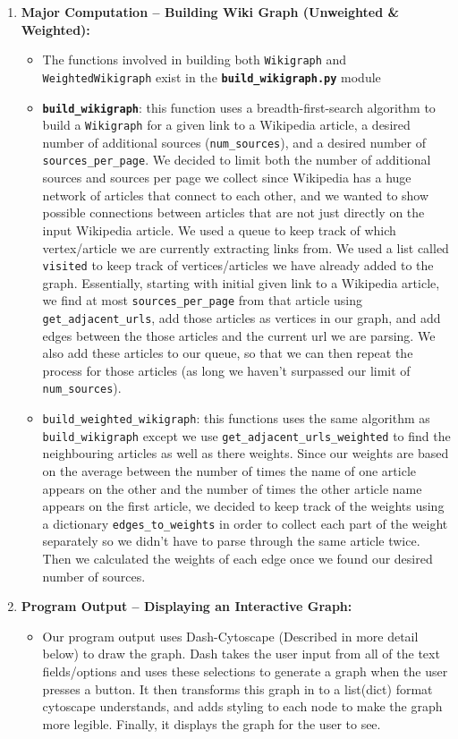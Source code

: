 \documentclass[fontsize=11pt]{article}
\begin{document}
\begin{enumerate}
\begin{itemize}
    \end{itemize}
    \item \textbf{Major Computation – Building Wiki Graph (Unweighted \& Weighted):}
    \begin{itemize}
        \item The functions involved in building both \texttt{Wikigraph} and \texttt{WeightedWikigraph} exist in the \textbf{\texttt{build\_wikigraph.py}} module
        \item \textbf{\texttt{build\_wikigraph}}: this function uses a breadth-first-search algorithm to build a \texttt{Wikigraph} for a given link to a Wikipedia article, a desired number of additional sources (\texttt{num\_sources}), and a desired number of \texttt{sources\_per\_page}. We decided to limit both the number of additional sources and sources per page we collect since Wikipedia has a huge network of articles that connect to each other, and we wanted to show possible connections between articles that are not just directly on the input Wikipedia article. We used a queue to keep track of which vertex/article we are currently extracting links from. We used a list called \texttt{visited} to keep track of vertices/articles we have already added to the graph. Essentially, starting with initial given link to a Wikipedia article, we find at most \texttt{sources\_per\_page} from that article using \texttt{get\_adjacent\_urls}, add those articles as vertices in our graph, and add edges between the those articles and the current url we are parsing. We also add these articles to our queue, so that we can then repeat the process for those articles (as long we haven't surpassed our limit of \texttt{num\_sources}).
        \item \texttt{build\_weighted\_wikigraph}: this functions uses the same algorithm as \texttt{build\_wikigraph} except we use \texttt{get\_adjacent\_urls\_weighted} to find the neighbouring articles as well as there weights. Since our weights are based on the average between the number of times the name of one article appears on the other and the number of times the other article name appears on the first article, we decided to keep track of the weights using a dictionary \texttt{edges\_to\_weights} in order to collect each part of the weight separately so we didn't have to parse through the same article twice. Then we calculated the weights of each edge once we found our desired number of sources.
    \end{itemize}
    \item \textbf{Program Output – Displaying an Interactive Graph:}
    \begin{itemize}
        \item Our program output uses Dash-Cytoscape (Described in more detail below) to draw the graph. Dash takes the user input from all of the text fields/options and uses these selections to generate a graph when the user presses a button. It then transforms this graph in to a list(dict) format cytoscape understands, and adds styling to each node to make the graph more legible. Finally, it displays the graph for the user to see.
        

\end{itemize}
\end{enumerate}
\end{document}
